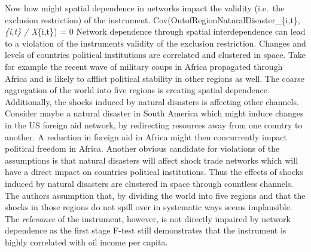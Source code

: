 \documentclass[
  a4paper,
]{article}
\begin{document}
Now how might spatial dependence in networks impact the validity
(i.e.~the exclusion restriction) of the instrument.
Cov(OutofRegionNaturalDisaster\_\{i,t\}, \varepsilon\emph{\{i,t\} /
\delta X}\{i,t\}) = 0 Network dependence through spatial interdependence
can lead to a violation of the instruments validity of the exclusion
restriction. Changes and levels of countries political institutions are
correlated and clustered in space. Take for example the recent wave of
military coups in Africa propagated through Africa and is likely to
afflict political stability in other regions as well. The coarse
aggregation of the world into five regions is creating spatial
dependence. Additionally, the shocks induced by natural disasters is
affecting other channels. Consider maybe a natural disaster in South
America which might induce changes in the US foreign aid network, by
redirecting resources away from one country to another. A reduction in
foreign aid in Africa might then concurrently impact political freedom
in Africa. Another obvious candidate for violations of the assumptions
is that natural disasters will affect shock trade networks which will
have a direct impact on countries political institutions. Thus the
effects of shocks induced by natural disasters are clustered in space
through countless channels. The authors assumption that, by dividing the
world into five regions and that the shocks in those regions do not
spill over in systematic ways seems implausible. The \textit{relevance}
of the instrument, however, is not directly impaired by network
dependence as the first stage F-test still demonstrates that the
instrument is highly correlated with oil income per capita.
\end{document}
